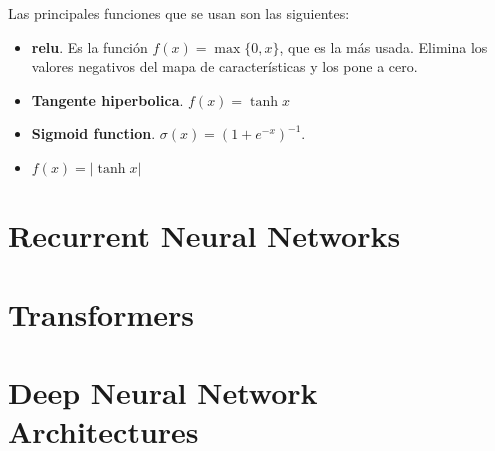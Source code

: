 Las principales funciones que se usan son las siguientes:
\begin{itemize}
  \item \textbf{\gls*{relu}}. Es la función \(f(x) = \max \{0, x\}\), que es la
  más usada. Elimina los valores negativos del mapa de características y los
  pone a cero.
  \item \textbf{Tangente hiperbolica}. \(f(x) = \tanh x\)
  \item \textbf{Sigmoid function}. \(\sigma(x) = {(1 + e^{-x})}^{-1}\).
  \item \(f(x) = |\tanh x|\)
\end{itemize}


\section{Recurrent Neural Networks}
\label{sec:recurr-neur-netw}







\section{Transformers}
\label{sec:transformers}


\section{Deep Neural Network Architectures}
